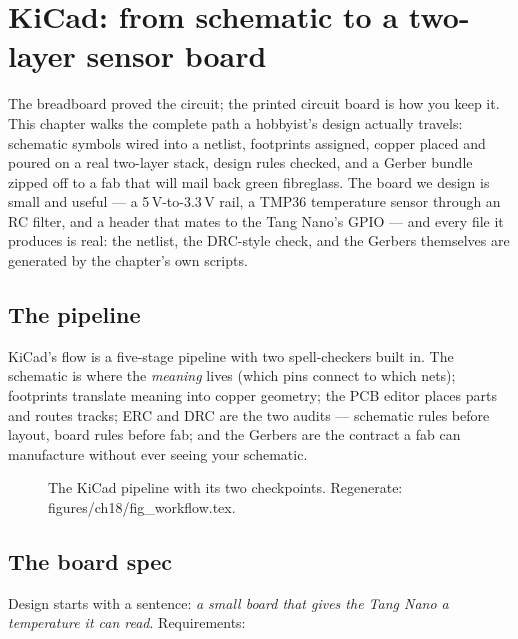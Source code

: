 \chapter{KiCad: from schematic to a two-layer sensor board}\label{ch:kicad}

The breadboard proved the circuit; the printed circuit board is how
you keep it. This chapter walks the complete path a hobbyist's design
actually travels: schematic symbols wired into a netlist, footprints
assigned, copper placed and poured on a real two-layer stack, design
rules checked, and a Gerber bundle zipped off to a fab that will mail
back green fibreglass. The board we design is small and useful --- a
5\,V-to-3.3\,V rail, a TMP36 temperature sensor through an RC filter,
and a header that mates to the Tang Nano's GPIO --- and every file it
produces is real: the netlist, the DRC-style check, and the Gerbers
themselves are generated by the chapter's own scripts.

\section{The pipeline}\label{sec:workflow18}

KiCad's flow is a five-stage pipeline with two spell-checkers built
in. The schematic is where the \emph{meaning} lives (which pins
connect to which nets); footprints translate meaning into copper
geometry; the PCB editor places parts and routes tracks; ERC and DRC
are the two audits --- schematic rules before layout, board rules
before fab; and the Gerbers are the contract a fab can manufacture
without ever seeing your schematic.

\begin{figure}[htbp]
\centering

\caption{The KiCad pipeline with its two checkpoints. Regenerate:
\ttfamily figures/ch18/fig\_workflow.tex.}
\label{fig:workflow18}
\end{figure}

\section{The board spec}\label{sec:spec18}

Design starts with a sentence: \emph{a small board that gives the
Tang Nano a temperature it can read}. Requirements:

